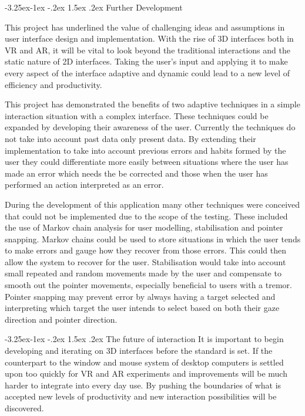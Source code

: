 \documentclass[12pt]{article}
\makeatletter
\renewcommand{\subsection}{\@startsection{subsection}{2}{\z@}%
             {-3.25ex\@plus -1ex \@minus -.2ex}%
             {1.5ex \@plus .2ex}%
             {\normalfont\large\scshape\bfseries}}
\makeatother
\begin{document}
\subsection{Further Development}

This project has underlined the value of challenging ideas and assumptions in user interface design and implementation. With the rise of 3D interfaces both in VR and AR, it will be vital to look beyond the traditional interactions and the static nature of 2D interfaces. Taking the user's input and applying it to make every aspect of the interface adaptive and dynamic could lead to a new level of efficiency and productivity.

This project has demonstrated the benefits of two adaptive techniques in a simple interaction situation with a complex interface. These techniques could be expanded by developing their awareness of the user. Currently the techniques do not take into account past data only present data. By extending their implementation to take into account previous errors and habits formed by the user they could differentiate more easily between situations where the user has made an error which needs the be corrected and those when the user has performed an action interpreted as an error. 

During the development of this application many other techniques were conceived that could not be implemented due to the scope of the testing. These included the use of Markov chain analysis for user modelling, stabilisation and pointer snapping. Markov chains could be used to store situations in which the user tends to make errors and gauge how they recover from those errors. This could then allow the system to recover for the user. Stabilisation would take into account small repeated and random movements made by the user and compensate to smooth out the pointer movements, especially beneficial to users with a tremor. Pointer snapping may prevent error by always having a target selected and interpreting which target the user intends to select based on both their gaze direction and pointer direction.

\subsection{The future of interaction}
It is important to begin developing and iterating on 3D interfaces before the standard is set. If the counterpart to the window and mouse system of desktop computers is settled upon too quickly for VR and AR experiments and improvements will be much harder to integrate into every day use. By pushing the boundaries of what is accepted new levels of productivity and new interaction possibilities will be discovered. 
\end{document}
